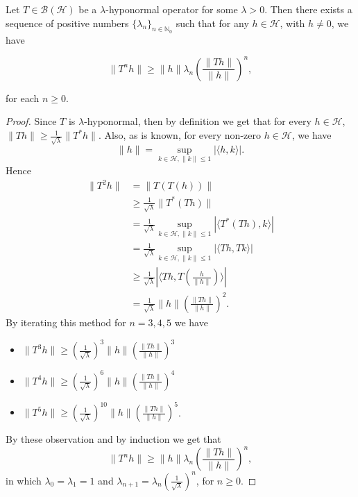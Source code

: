 \documentclass[10pt,a4paper]{amsart}
\begin{document}
\begin{prop}\label{p2.1n}
Let $T\in \mathcal{B}(\mathcal{H})$ be a $\lambda$-hyponormal operator for some $\lambda>0$. Then there exists a sequence of positive numbers $\{\lambda_n\}_{n\in\mathbb{N}_0}$ such that for any $h\in \mathcal{H}$, with $h\neq 0$, we have 

$$\|T^nh\|\geq \|h\|\lambda_n\left(\frac{\|Th\|}{\|h\|}\right)^n,$$

for each $n\geq 0$.
\end{prop}

\begin{proof}
Since $T$ is $\lambda$-hyponormal, then by definition we get that for every $h\in \mathcal{H}$,
$\|Th\|\geq \frac{1}{\sqrt{\lambda}}\|T^*h\|$.
Also, as is known, for every non-zero $h\in \mathcal{H}$, we have 
$$\|h\|=\sup_{k\in\mathcal{H},\|k\|\leq 1}|\langle h,k\rangle|.$$
Hence 
\begin{align*}
\|T^2h\|&=\|T(T(h))\|\\
&\geq \frac{1}{\sqrt{\lambda}}\|T^*(Th)\|\\
&=\frac{1}{\sqrt{\lambda}}\sup_{k\in\mathcal{H},\|k\|\leq 1}|\langle T^*(Th),k\rangle|\\
&=\frac{1}{\sqrt{\lambda}}\sup_{k\in\mathcal{H},\|k\|\leq 1}|\langle Th,Tk\rangle|\\
&\geq\frac{1}{\sqrt{\lambda}}|\langle Th,T(\frac{h}{\|h\|})\rangle|\\
&=\frac{1}{\sqrt{\lambda}}\|h\|\left(\frac{\|Th\|}{\|h\|}\right)^2.
\end{align*}
By iterating this method for $n=3,4,5$ we have 
\begin{itemize}
  \item $\|T^3h\|\geq \left(\frac{1}{\sqrt{\lambda}}\right)^3\|h\|\left(\frac{\|Th\|}{\|h\|}\right)^3$
  \item $\|T^4h\|\geq \left(\frac{1}{\sqrt{\lambda}}\right)^6\|h\|\left(\frac{\|Th\|}{\|h\|}\right)^4$
  \item $\|T^5h\|\geq \left(\frac{1}{\sqrt{\lambda}}\right)^{10}\|h\|\left(\frac{\|Th\|}{\|h\|}\right)^{5}$.
\end{itemize}
By these observation and by induction we get that 
$$\|T^nh\|\geq \|h\|\lambda_n\left(\frac{\|Th\|}{\|h\|}\right)^n,$$
in which $\lambda_0=\lambda_1=1$ and $\lambda_{n+1}=\lambda_n \left(\frac{1}{\sqrt{\lambda}}\right)^n$, for $n\geq 0$.
\end{proof}
\end{document}
